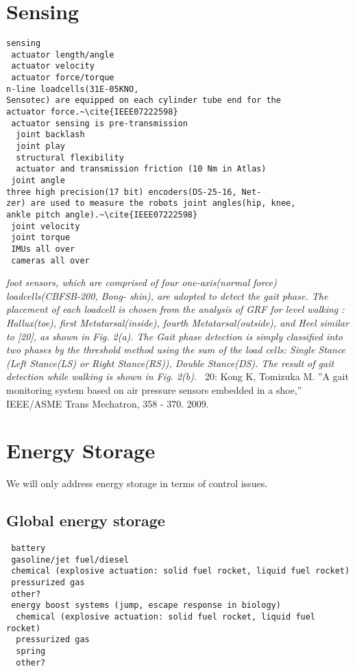 \documentclass[letterpaper,12pt,fullpage]{article}
\begin{document}
\section{Sensing}

\begin{verbatim}
sensing
 actuator length/angle
 actuator velocity
 actuator force/torque 
n-line loadcells(31E-05KNO,
Sensotec) are equipped on each cylinder tube end for the
actuator force.~\cite{IEEE07222598}
 actuator sensing is pre-transmission
  joint backlash
  joint play
  structural flexibility
  actuator and transmission friction (10 Nm in Atlas)
 joint angle
three high precision(17 bit) encoders(DS-25-16, Net-
zer) are used to measure the robots joint angles(hip, knee,
ankle pitch angle).~\cite{IEEE07222598}
 joint velocity
 joint torque
 IMUs all over
 cameras all over
\end{verbatim}

{\it foot sensors, which are comprised
of four one-axis(normal force) loadcells(CBFSB-200, Bong-
shin), are adopted to detect the gait phase. The placement
of each loadcell is chosen from the analysis of GRF for
level walking : Hallux(toe), first Metatarsal(inside), fourth
Metatarsal(outside), and Heel similar to [20], as shown in
Fig. 2(a). The Gait phase detection is simply classified
into two phases by the threshold method using the sum
of the load cells: Single Stance (Left Stance(LS) or Right
Stance(RS)), Double Stance(DS). The result of gait detection
while walking is shown in Fig. 2(b).}~\cite{IEEE07222598}
20: Kong K, Tomizuka M. ”A gait monitoring system based on air pressure
sensors embedded in a shoe,” IEEE/ASME Trans Mechatron, 358 - 370.
2009.

\section{Energy Storage}

We will only address energy storage
in terms of control issues.

\subsection{Global energy storage}

\begin{verbatim}
 battery
 gasoline/jet fuel/diesel
 chemical (explosive actuation: solid fuel rocket, liquid fuel rocket)
 pressurized gas
 other?
 energy boost systems (jump, escape response in biology)
  chemical (explosive actuation: solid fuel rocket, liquid fuel rocket)
  pressurized gas
  spring
  other?
\end{verbatim}
\end{document}
